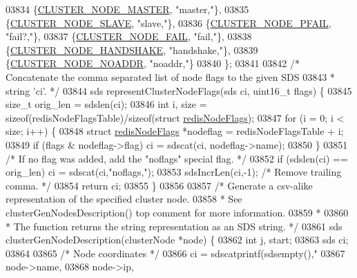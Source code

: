 \begin{DoxyCode}
{{{{{{{{{{{{{{{{{{{{{{{{{{{{{{{{{{{{{{{{{{{{{{{{{{{{{{{{{{{{{{{{03834     \{\hyperlink{cluster_8h_a5dcea846e31b55b73244aa2e496a31bf}{CLUSTER\_NODE\_MASTER},       \textcolor{stringliteral}{"master,"}\},
03835     \{\hyperlink{cluster_8h_a34b7bfd1f810397be68c3b5d13d4d134}{CLUSTER\_NODE\_SLAVE},        \textcolor{stringliteral}{"slave,"}\},
03836     \{\hyperlink{cluster_8h_a5306c1ae8988b8be0a1a02bd9162dfa1}{CLUSTER\_NODE\_PFAIL},        \textcolor{stringliteral}{"fail?,"}\},
03837     \{\hyperlink{cluster_8h_ad211e85c7baf8a5a59acd747e4e9005a}{CLUSTER\_NODE\_FAIL},         \textcolor{stringliteral}{"fail,"}\},
03838     \{\hyperlink{cluster_8h_a60571342a067f1e5772a04b36feff6a6}{CLUSTER\_NODE\_HANDSHAKE},    \textcolor{stringliteral}{"handshake,"}\},
03839     \{\hyperlink{cluster_8h_a2bbed8bf0615871a01ca8b7f691b56d8}{CLUSTER\_NODE\_NOADDR},       \textcolor{stringliteral}{"noaddr,"}\}
03840 \};
03841 
03842 \textcolor{comment}{/* Concatenate the comma separated list of node flags to the given SDS}
03843 \textcolor{comment}{ * string 'ci'. */}
03844 sds representClusterNodeFlags(sds ci, uint16\_t flags) \{
03845     size\_t orig\_len = sdslen(ci);
03846     \textcolor{keywordtype}{int} i, size = \textcolor{keyword}{sizeof}(redisNodeFlagsTable)/\textcolor{keyword}{sizeof}(\textcolor{keyword}{struct} \hyperlink{structredisNodeFlags}{redisNodeFlags});
03847     \textcolor{keywordflow}{for} (i = 0; i < size; i++) \{
03848         \textcolor{keyword}{struct} \hyperlink{structredisNodeFlags}{redisNodeFlags} *nodeflag = redisNodeFlagsTable + i;
03849         \textcolor{keywordflow}{if} (flags & nodeflag->flag) ci = sdscat(ci, nodeflag->name);
03850     \}
03851     \textcolor{comment}{/* If no flag was added, add the "noflags" special flag. */}
03852     \textcolor{keywordflow}{if} (sdslen(ci) == orig\_len) ci = sdscat(ci,\textcolor{stringliteral}{"noflags,"});
03853     sdsIncrLen(ci,-1); \textcolor{comment}{/* Remove trailing comma. */}
03854     \textcolor{keywordflow}{return} ci;
03855 \}
03856 
03857 \textcolor{comment}{/* Generate a csv-alike representation of the specified cluster node.}
03858 \textcolor{comment}{ * See clusterGenNodesDescription() top comment for more information.}
03859 \textcolor{comment}{ *}
03860 \textcolor{comment}{ * The function returns the string representation as an SDS string. */}
03861 sds clusterGenNodeDescription(clusterNode *node) \{
03862     \textcolor{keywordtype}{int} j, start;
03863     sds ci;
03864 
03865     \textcolor{comment}{/* Node coordinates */}
03866     ci = sdscatprintf(sdsempty(),\textcolor{stringliteral}{"%
03867         node->name,
03868         node->ip,
}}}}}}}}}}}}}}}}}}}}}}}}}}}}}}}}}}}}}}}}}}}}}}}}}}}}}}}}}}}}}}}}}
\end{DoxyCode}
